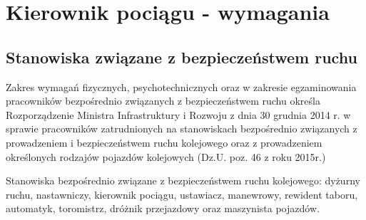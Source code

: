 \documentclass[usenames,dvipsnames,svgnames,table,a4paper,openany,justified]{tufte-book}
\begin{document}
\part{Kierownik pociągu - wymagania}
\chapter{Stanowiska związane z bezpieczeństwem ruchu}
Zakres wymagań fizycznych, psychotechnicznych oraz w zakresie egzaminowania pracowników bezpośrednio związanych z bezpieczeństwem ruchu określa Rozporządzenie Ministra Infrastruktury i Rozwoju z dnia 30 grudnia 2014 r. w sprawie pracowników zatrudnionych na stanowiskach bezpośrednio związanych z prowadzeniem i bezpieczeństwem ruchu kolejowego oraz z prowadzeniem określonych rodzajów pojazdów kolejowych (Dz.U. poz. 46 z roku 2015r.)

Stanowiska bezpośrednio związane z bezpieczeństwem ruchu kolejowego: dyżurny ruchu, nastawniczy, kierownik pociągu, ustawiacz, manewrowy, rewident taboru, automatyk, toromistrz, dróżnik przejazdowy oraz maszynista pojazdów.
\end{document}
